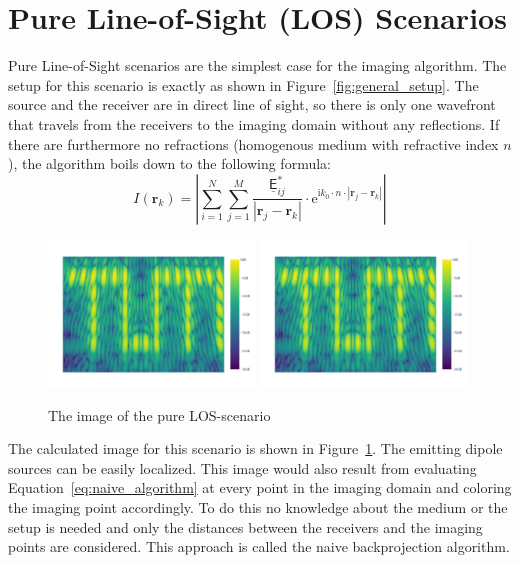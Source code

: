 \section{Pure Line-of-Sight (LOS) Scenarios}
Pure Line-of-Sight scenarios are the simplest case for the imaging algorithm.
The setup for this scenario is exactly as shown in Figure~\ref{fig:general_setup}.
The source and the receiver are in direct line of sight, so there is only one wavefront that travels from the receivers to the imaging domain without any reflections.
If there are furthermore no refractions (homogenous medium with refractive index \(n\)), the algorithm boils down to the following formula:
\begin{equation}\label{eq:naive_algorithm}
    I(\bm{r}_k) = |\sum_{i=1}^{N} \sum_{j=1}^{M} \frac{\underline{\mathsf{E}}_{ij}^*}{|\bm{r}_j - \bm{r}_k|} \cdot \mathrm{e}^{\mathrm{i}k_0\cdot n \cdot |\bm{r}_j - \bm{r}_k|}|
\end{equation}

\begin{figure}[ht]
    \centering
    \includegraphics[page=2, width=0.49\textwidth]{figures/pure_los.pdf}
    \includegraphics[page=1, width=0.49\textwidth]{figures/pure_los.pdf}
    \caption{The image of the pure LOS-scenario}\label{fig:los_results}
\end{figure}

The calculated image for this scenario is shown in Figure~\ref{fig:los_results}.
The emitting dipole sources can be easily localized.
This image would also result from evaluating Equation~\eqref{eq:naive_algorithm} at every point in the imaging domain and coloring the imaging point accordingly.
To do this no knowledge about the medium or the setup is needed and only the distances between the receivers and the imaging points are considered.
This approach is called the naive backprojection algorithm.


